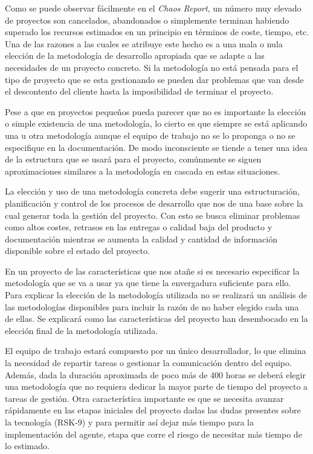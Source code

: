 Como se puede observar fácilmente en el \textit{Chaos Report}\cite{chaos}, un número muy elevado de proyectos son cancelados, abandonados o simplemente terminan habiendo superado los recursos estimados en un principio en términos de coste, tiempo, etc. Una de las razones a las cuales se atribuye este hecho es a una mala o nula elección de la metodología de desarrollo apropiada que se adapte a las necesidades de un proyecto concreto. Si la metodología no está pensada para el tipo de proyecto que se esta gestionando se pueden dar problemas que van desde el descontento del cliente hasta la imposibilidad de terminar el proyecto.

\bigskip

Pese a que en proyectos pequeños pueda parecer que no es importante la elección o simple existencia de una metodología, lo cierto es que siempre se está aplicando una u otra metodología aunque el equipo de trabajo no se lo proponga o no se especifique en la documentación. De modo inconsciente se tiende a tener una idea de la estructura que se usará para el proyecto, comúnmente se siguen aproximaciones similares a la metodología en cascada en estas situaciones.

\bigskip

La elección y uso de una metodología concreta debe sugerir una estructuración, planificación y control de los procesos de desarrollo que nos de una base sobre la cual generar toda la gestión del proyecto. Con esto se busca eliminar problemas como altos costes, retrasos en las entregas o calidad baja del producto y documentación mientras se aumenta la calidad y cantidad de información disponible sobre el estado del proyecto.

\bigskip

En un proyecto de las características que nos atañe si es necesario especificar la metodología que se va a usar ya que tiene la envergadura suficiente para ello. Para explicar la elección de la metodología utilizada no se realizará un análisis de las metodologías disponibles para incluir la razón de no haber elegido cada una de ellas. Se explicará como las características del proyecto han desembocado en la elección final de la metodología utilizada.

\bigskip

El equipo de trabajo estará compuesto por un único desarrollador, lo que elimina la necesidad de repartir tareas o gestionar la comunicación dentro del equipo. Además, dada la duración aproximada de poco más de 400 horas se deberá elegir una metodología que no requiera dedicar la mayor parte de tiempo del proyecto a tareas de gestión. Otra característica importante es que se necesita avanzar rápidamente en las etapas iniciales del proyecto dadas las dudas presentes sobre la tecnología (RSK-9) y para permitir así dejar más tiempo para la implementación del agente, etapa que corre el riesgo de necesitar más tiempo de lo estimado.

